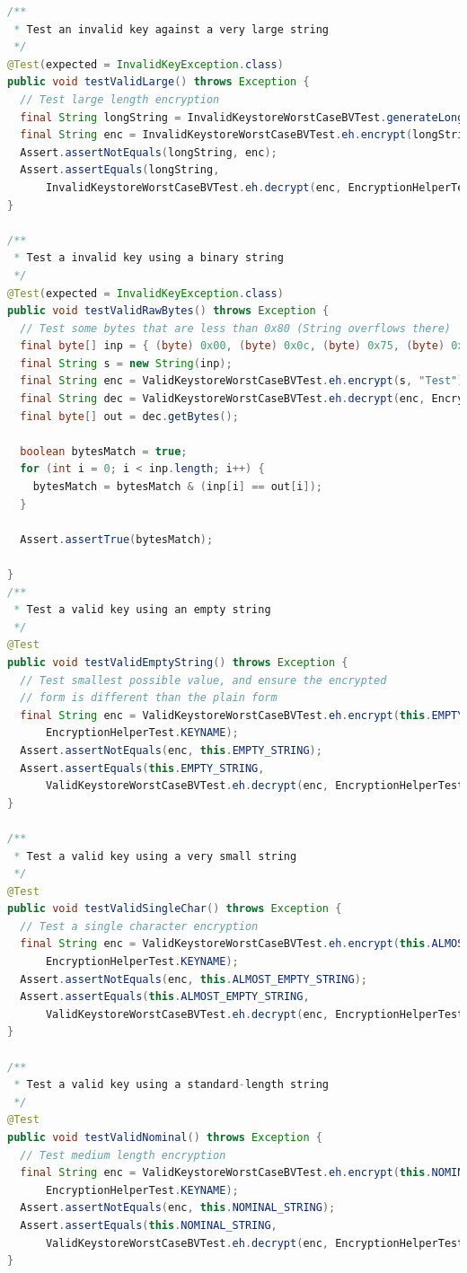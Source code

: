 \begin{lstlisting}[language=Java]
/**
 * Test an invalid key against a very large string
 */
@Test(expected = InvalidKeyException.class)
public void testValidLarge() throws Exception {
  // Test large length encryption
  final String longString = InvalidKeystoreWorstCaseBVTest.generateLongString(4096);
  final String enc = InvalidKeystoreWorstCaseBVTest.eh.encrypt(longString, "Test");
  Assert.assertNotEquals(longString, enc);
  Assert.assertEquals(longString,
      InvalidKeystoreWorstCaseBVTest.eh.decrypt(enc, EncryptionHelperTest.KEYNAME));
}

/**
 * Test a invalid key using a binary string
 */
@Test(expected = InvalidKeyException.class)
public void testValidRawBytes() throws Exception {
  // Test some bytes that are less than 0x80 (String overflows there)
  final byte[] inp = { (byte) 0x00, (byte) 0x0c, (byte) 0x75, (byte) 0x00, (byte) 0x13 };
  final String s = new String(inp);
  final String enc = ValidKeystoreWorstCaseBVTest.eh.encrypt(s, "Test");
  final String dec = ValidKeystoreWorstCaseBVTest.eh.decrypt(enc, EncryptionHelperTest.KEYNAME);
  final byte[] out = dec.getBytes();

  boolean bytesMatch = true;
  for (int i = 0; i < inp.length; i++) {
    bytesMatch = bytesMatch & (inp[i] == out[i]);
  }

  Assert.assertTrue(bytesMatch);

}
/**
 * Test a valid key using an empty string
 */
@Test
public void testValidEmptyString() throws Exception {
  // Test smallest possible value, and ensure the encrypted
  // form is different than the plain form
  final String enc = ValidKeystoreWorstCaseBVTest.eh.encrypt(this.EMPTY_STRING,
      EncryptionHelperTest.KEYNAME);
  Assert.assertNotEquals(enc, this.EMPTY_STRING);
  Assert.assertEquals(this.EMPTY_STRING,
      ValidKeystoreWorstCaseBVTest.eh.decrypt(enc, EncryptionHelperTest.KEYNAME));
}

/**
 * Test a valid key using a very small string
 */
@Test
public void testValidSingleChar() throws Exception {
  // Test a single character encryption
  final String enc = ValidKeystoreWorstCaseBVTest.eh.encrypt(this.ALMOST_EMPTY_STRING,
      EncryptionHelperTest.KEYNAME);
  Assert.assertNotEquals(enc, this.ALMOST_EMPTY_STRING);
  Assert.assertEquals(this.ALMOST_EMPTY_STRING,
      ValidKeystoreWorstCaseBVTest.eh.decrypt(enc, EncryptionHelperTest.KEYNAME));
}

/**
 * Test a valid key using a standard-length string
 */
@Test
public void testValidNominal() throws Exception {
  // Test medium length encryption
  final String enc = ValidKeystoreWorstCaseBVTest.eh.encrypt(this.NOMINAL_STRING,
      EncryptionHelperTest.KEYNAME);
  Assert.assertNotEquals(enc, this.NOMINAL_STRING);
  Assert.assertEquals(this.NOMINAL_STRING,
      ValidKeystoreWorstCaseBVTest.eh.decrypt(enc, EncryptionHelperTest.KEYNAME));
}


\end{lstlisting}
